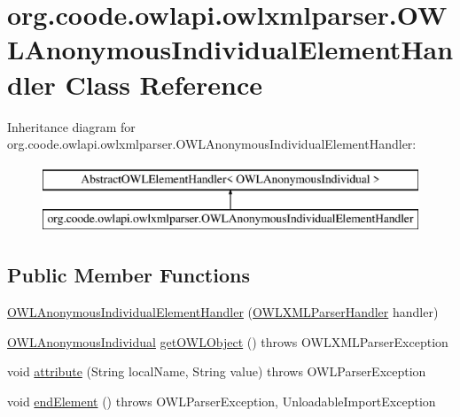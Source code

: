 \hypertarget{classorg_1_1coode_1_1owlapi_1_1owlxmlparser_1_1_o_w_l_anonymous_individual_element_handler}{\section{org.\-coode.\-owlapi.\-owlxmlparser.\-O\-W\-L\-Anonymous\-Individual\-Element\-Handler Class Reference}
\label{classorg_1_1coode_1_1owlapi_1_1owlxmlparser_1_1_o_w_l_anonymous_individual_element_handler}
}
Inheritance diagram for org.\-coode.\-owlapi.\-owlxmlparser.\-O\-W\-L\-Anonymous\-Individual\-Element\-Handler\-:\begin{figure}[H]
\begin{center}
\leavevmode
\includegraphics[height=2.000000cm]{classorg_1_1coode_1_1owlapi_1_1owlxmlparser_1_1_o_w_l_anonymous_individual_element_handler}
\end{center}
\end{figure}
\subsection*{Public Member Functions}
\begin{DoxyCompactItemize}
\item 
\hyperlink{classorg_1_1coode_1_1owlapi_1_1owlxmlparser_1_1_o_w_l_anonymous_individual_element_handler_a7c8c5e9591cb61e67c2daa76a3efd955}{O\-W\-L\-Anonymous\-Individual\-Element\-Handler} (\hyperlink{classorg_1_1coode_1_1owlapi_1_1owlxmlparser_1_1_o_w_l_x_m_l_parser_handler}{O\-W\-L\-X\-M\-L\-Parser\-Handler} handler)
\item 
\hyperlink{interfaceorg_1_1semanticweb_1_1owlapi_1_1model_1_1_o_w_l_anonymous_individual}{O\-W\-L\-Anonymous\-Individual} \hyperlink{classorg_1_1coode_1_1owlapi_1_1owlxmlparser_1_1_o_w_l_anonymous_individual_element_handler_a033014cf2d9c4df8c6c9ba552b435f73}{get\-O\-W\-L\-Object} ()  throws O\-W\-L\-X\-M\-L\-Parser\-Exception 
\item 
void \hyperlink{classorg_1_1coode_1_1owlapi_1_1owlxmlparser_1_1_o_w_l_anonymous_individual_element_handler_acd5f994d537ff839715eef1cf4115788}{attribute} (String local\-Name, String value)  throws O\-W\-L\-Parser\-Exception 
\item 
void \hyperlink{classorg_1_1coode_1_1owlapi_1_1owlxmlparser_1_1_o_w_l_anonymous_individual_element_handler_ae9289cfcb4c75373385a0525d0f71330}{end\-Element} ()  throws O\-W\-L\-Parser\-Exception, Unloadable\-Import\-Exception 
\end{DoxyCompactItemize}

